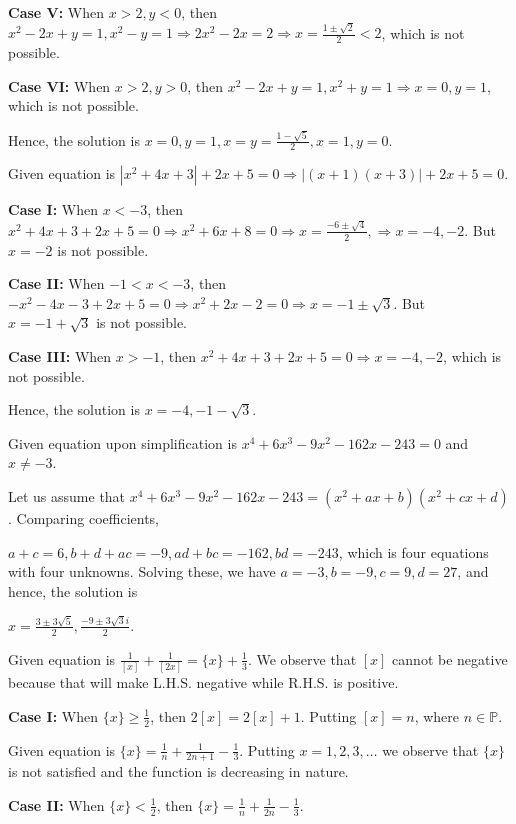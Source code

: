   {\bf Case V:} When $x > 2, y < 0$, then $x^2 - 2x + y = 1, x^2 - y = 1\Rightarrow 2x^2 - 2x = 2
  \Rightarrow x = \frac{1 \pm\sqrt{2}}{2} < 2$, which is not possible.

  {\bf Case VI:} When $x > 2, y > 0$, then $x^2 - 2x + y = 1, x^2 + y = 1\Rightarrow x = 0, y = 1$, which is
  not possible.

  Hence, the solution is $x = 0, y = 1, x = y = \frac{1 -\sqrt{5}}{2}, x = 1, y = 0$.
\item Given equation is $|x^2 + 4x + 3| + 2x + 5 = 0\Rightarrow |(x + 1)(x + 3)| + 2x + 5 = 0$.

  {\bf Case I:} When $x < -3$, then $x^2 + 4x + 3 + 2x + 5 = 0 \Rightarrow x^2 + 6x + 8 = 0 \Rightarrow x =
  \frac{-6\pm\sqrt{4}}{2}, \Rightarrow x = -4, -2$. But $x = -2$ is not possible.

  {\bf Case II:} When $-1 < x < -3$, then $-x^2 - 4x - 3 + 2x + 5 = 0 \Rightarrow x^2 + 2x - 2 = 0
  \Rightarrow x = -1\pm\sqrt{3}$. But $x = -1 + \sqrt{3}$ is not possible.

  {\bf Case III:} When $x > -1$, then $x^2 + 4x + 3 + 2x + 5 = 0 \Rightarrow x = -4, -2$, which is not
  possible.

  Hence, the solution is $x = -4, -1 - \sqrt{3}$.
\item Given equation upon simplification is $x^4 + 6x^3 - 9x^2 - 162x - 243 = 0$ and $x\neq -3$.

  Let us assume that $x^4 + 6x^3 - 9x^2 - 162x - 243 = (x^2 + ax + b)(x^2 + cx + d)$. Comparing
  coefficients,

  $a + c = 6, b + d + ac = -9, ad + bc = -162, bd = -243$, which is four equations with four
  unknowns. Solving these, we have $a = -3, b = -9, c = 9, d = 27$, and hence, the solution is

  $x = \frac{3\pm3\sqrt{5}}{2}, \frac{-9\pm3\sqrt{3}i}{2}$.
\item Given equation is $\frac{1}{[x]} + \frac{1}{[2x]} = \{x\} + \frac{1}{3}$. We observe that $[x]$ cannot
  be negative because that will make L.H.S. negative while R.H.S. is positive.

  {\bf Case I:} When $\{x\}\geq\frac{1}{2}$, then $2[x] = 2[x] + 1$. Putting $[x] = n$, where
  $n\in\mathbb{P}$.

  Given equation is $\{x\} = \frac{1}{n} + \frac{1}{2n + 1} - \frac{1}{3}$. Putting $x = 1, 2, 3, \ldots$
  we observe that $\{x\}$ is not satisfied and the function is decreasing in nature.

  {\bf Case II:} When $\{x\} < \frac{1}{2}$, then $\{x\} = \frac{1}{n} + \frac{1}{2n} - \frac{1}{3}$.


